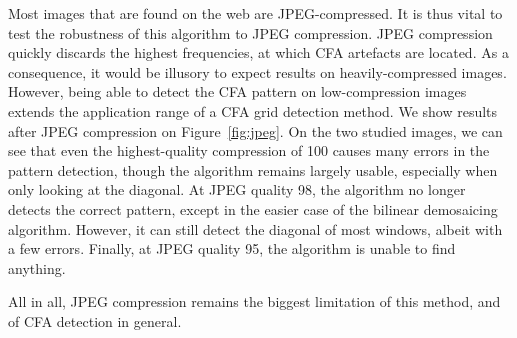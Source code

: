 \documentclass{ipol}
\begin{document}
Most images that are found on the web are JPEG-compressed. It is thus vital to test the robustness of this algorithm to JPEG compression. JPEG compression quickly discards the highest frequencies, at which CFA artefacts are located. As a consequence, it would be illusory to expect results on heavily-compressed images. However, being able to detect the CFA pattern on low-compression images extends the application range of a CFA grid detection method. We show results after JPEG compression on Figure~\ref{fig:jpeg}. On the two studied images, we can see that even the highest-quality compression of 100 causes many errors in the pattern detection, though the algorithm remains largely usable, especially when only looking at the diagonal. At JPEG quality 98, the algorithm no longer detects the correct pattern, except in the easier case of the bilinear demosaicing algorithm. However, it can still detect the diagonal of most windows, albeit with a few errors. Finally, at JPEG quality 95, the algorithm is unable to find anything.

All in all, JPEG compression remains the biggest limitation of this method, and of CFA detection in general. 
\end{document}
